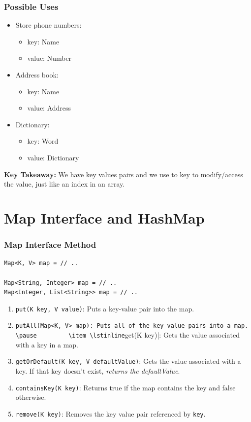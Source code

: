 \documentclass{beamer}
\begin{document}
\begin{frame}[fragile]
    \frametitle{Possible Uses}
    \begin{itemize}
        \item Store phone numbers:
            \begin{itemize}
                \item key: Name
                \item value: Number
            \end{itemize}
        \item Address book:
            \begin{itemize}
                \item key: Name
                \item value: Address
            \end{itemize}
        \item Dictionary:
            \begin{itemize}
                \item key: Word
                \item value: Dictionary
            \end{itemize}
    \end{itemize}
    \vfill
    \textbf{Key Takeaway:} We have key values pairs and we use to key to modify/access the value, just like an index in an array.
\end{frame}


\section{Map Interface and HashMap}

\begin{frame}[fragile]
    \frametitle{Map Interface Method}
    \begin{lstlisting}[frame=trBL]
Map<K, V> map = // ..

Map<String, Integer> map = // ..
Map<Integer, List<String>> map = // ..
    \end{lstlisting}
    \vfill
    \pause
    \begin{enumerate}
        \item \lstinline|put(K key, V value)|: Puts a key-value pair into the map.
        \item \lstinline|putAll(Map<K, V> map): Puts all of the key-value pairs into a map.
        \pause
        \item \lstinline|get(K key)|: Gets the value associated with a key in a map.
        \item \lstinline|getOrDefault(K key, V defaultValue)|: Gets the value associated with a key. If that key doesn't exist, \textit{returns the defaultValue}.
        \pause
        \item \lstinline|containsKey(K key)|: Returns true if the map contains the key and false otherwise.
        \pause
        \item \lstinline|remove(K key)|: Removes the key value pair referenced by \texttt{key}.
    \end{enumerate}
\end{frame}
\end{document}
